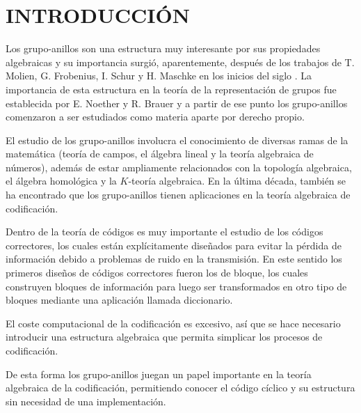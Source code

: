 \chapter{INTRODUCCIÓN}
Los grupo-anillos son una estructura muy interesante por sus propiedades algebraicas y su importancia surgió, aparentemente, después de los trabajos de T. Molien, G. Frobenius, I. Schur y H. Maschke en los inicios del siglo . La importancia de esta estructura en la teoría de la representación de grupos fue establecida por E. Noether y R. Brauer y a partir de ese punto los grupo-anillos comenzaron a ser estudiados como materia aparte por derecho propio. 

El estudio de los grupo-anillos involucra el conocimiento de diversas ramas de la matemática (teoría de campos, el álgebra lineal y la teoría algebraica de números), además de estar ampliamente relacionados con la topología algebraica, el álgebra homológica y la $K$-teoría algebraica. En la última década, también se ha encontrado que los grupo-anillos tienen aplicaciones en la teoría algebraica de codificación.

Dentro de la teoría de códigos es muy importante el estudio de los códigos correctores, los cuales están explícitamente diseñados para evitar la pérdida de información debido a problemas de ruido en la transmisión. En este sentido los primeros diseños de códigos correctores fueron los de bloque, los cuales construyen bloques de información para luego ser transformados en otro tipo de bloques mediante una aplicación llamada diccionario. 

El coste computacional de la codificación es excesivo, así que se hace necesario introducir una estructura algebraica que permita simplicar los procesos de codificación. 

\newpage De esta forma los grupo-anillos juegan un papel importante en la teoría algebraica de la codificación, permitiendo conocer el código cíclico y su estructura sin necesidad de una implementación.

